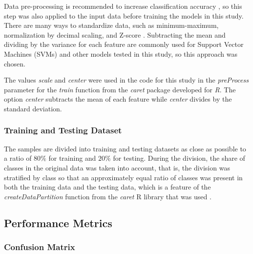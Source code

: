 \documentclass[sn-mathphys-num]{sn-jnl}%
\begin{document}
Data pre-processing is recommended to increase classification accuracy \cite{Fan2008}, so this step was also applied to the input data before training the models in this study. There are many ways to standardize data, such as minimum-maximum, normalization by decimal scaling, and Z-score \cite{Mohamad2013}. Subtracting the mean and dividing by the variance for each feature are commonly used for Support Vector Machines (SVMs) \cite{Fennell2019} and other models tested in this study, so this approach was chosen. 

The values \textit{scale} and \textit{center} were used in the code for this study in the \textit{preProcess} parameter for the \textit{train} function from the \textit{caret} package developed for \textit{R}. The option \textit{center} subtracts the mean of each feature while \textit{center} divides by the standard deviation. 

\subsubsection{Training and Testing Dataset}

The samples are divided into training and testing datasets as close as possible to a ratio of $80\%$ for training and $20\%$ for testing. During the division, the share of classes in the original data was taken into account, that is, the division was stratified by class so that an approximately equal ratio of classes was present in both the training data and the testing data, which is a feature of the \textit{createDataPartition} function from the \textit{caret} R library that was used \cite{topepoDataSplitting, hyndman2018forecasting, rdocumentationCreateDataPartitionFunction}.

\subsection{Performance Metrics}

\subsubsection{Confusion Matrix}
\end{document}
